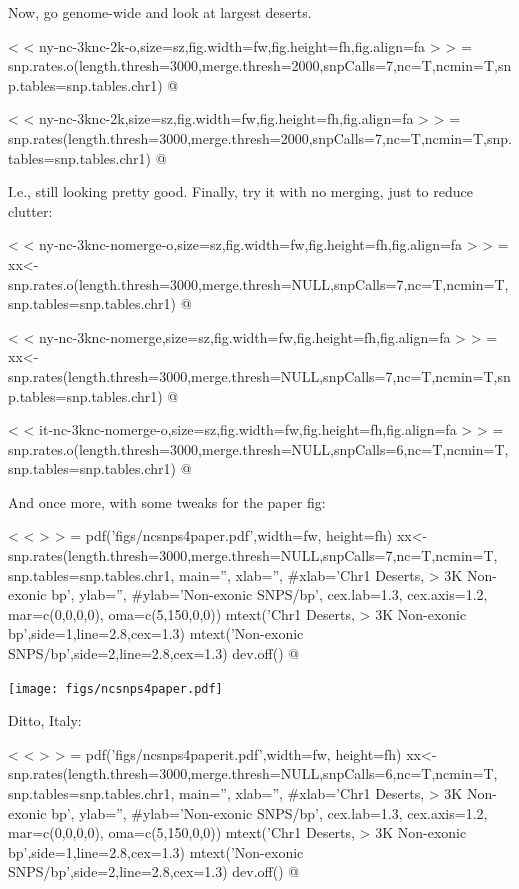 \documentclass{article}\usepackage[]{graphicx}\usepackage[]{color}
\begin{document}
Now, go genome-wide and look at largest deserts.

\iffalse
< < ny-nc-3knc-2k-o,size=sz,fig.width=fw,fig.height=fh,fig.align=fa > > =
snp.rates.o(length.thresh=3000,merge.thresh=2000,snpCalls=7,nc=T,ncmin=T,snp.tables=snp.tables.chr1)
@

< < ny-nc-3knc-2k,size=sz,fig.width=fw,fig.height=fh,fig.align=fa > > =
snp.rates(length.thresh=3000,merge.thresh=2000,snpCalls=7,nc=T,ncmin=T,snp.tables=snp.tables.chr1)
@

I.e., still looking pretty good.  Finally, try it with no merging, just to reduce clutter:

< < ny-nc-3knc-nomerge-o,size=sz,fig.width=fw,fig.height=fh,fig.align=fa > > =
xx<-snp.rates.o(length.thresh=3000,merge.thresh=NULL,snpCalls=7,nc=T,ncmin=T,snp.tables=snp.tables.chr1)
@

< < ny-nc-3knc-nomerge,size=sz,fig.width=fw,fig.height=fh,fig.align=fa > > =
xx<-snp.rates(length.thresh=3000,merge.thresh=NULL,snpCalls=7,nc=T,ncmin=T,snp.tables=snp.tables.chr1)
@

< < it-nc-3knc-nomerge-o,size=sz,fig.width=fw,fig.height=fh,fig.align=fa > > =
snp.rates.o(length.thresh=3000,merge.thresh=NULL,snpCalls=6,nc=T,ncmin=T,snp.tables=snp.tables.chr1)
@

And once more, with some tweaks for the paper fig:

< < > > =
pdf('figs/ncsnps4paper.pdf',width=fw, height=fh)
xx<-snp.rates(length.thresh=3000,merge.thresh=NULL,snpCalls=7,nc=T,ncmin=T,
              snp.tables=snp.tables.chr1, 
              main='', 
              xlab='', #xlab='Chr1 Deserts, > 3K Non-exonic bp', 
              ylab='', #ylab='Non-exonic SNPS/bp', 
              cex.lab=1.3,
              cex.axis=1.2,
              mar=c(0,0,0,0),
              oma=c(5,150,0,0))
mtext('Chr1 Deserts, > 3K Non-exonic bp',side=1,line=2.8,cex=1.3)
mtext('Non-exonic SNPS/bp',side=2,line=2.8,cex=1.3)
dev.off()
@

\texttt{[image: figs/ncsnps4paper.pdf]}

Ditto, Italy:

< < > > =
pdf('figs/ncsnps4paperit.pdf',width=fw, height=fh)
xx<-snp.rates(length.thresh=3000,merge.thresh=NULL,snpCalls=6,nc=T,ncmin=T,
              snp.tables=snp.tables.chr1, 
              main='', 
              xlab='', #xlab='Chr1 Deserts, > 3K Non-exonic bp', 
              ylab='', #ylab='Non-exonic SNPS/bp', 
              cex.lab=1.3,
              cex.axis=1.2,
              mar=c(0,0,0,0),
              oma=c(5,150,0,0))
mtext('Chr1 Deserts, > 3K Non-exonic bp',side=1,line=2.8,cex=1.3)
mtext('Non-exonic SNPS/bp',side=2,line=2.8,cex=1.3)
dev.off()
@
\end{document}
